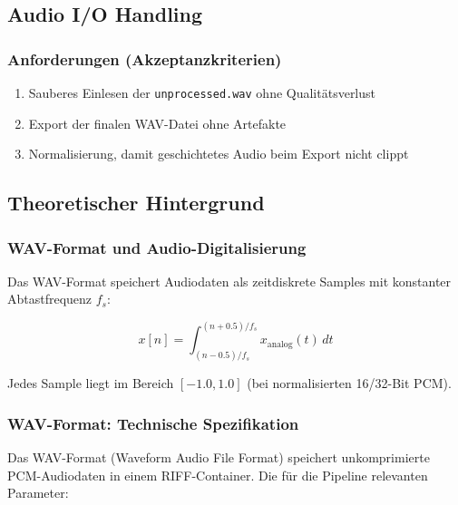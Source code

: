 \subsection{Audio I/O Handling}

\subsubsection{Anforderungen (Akzeptanzkriterien)}

\begin{enumerate}
    \item Sauberes Einlesen der \texttt{unprocessed.wav} ohne Qualit\"atsverlust
    \item Export der finalen WAV-Datei ohne Artefakte
    \item Normalisierung, damit geschichtetes Audio beim Export nicht clippt
\end{enumerate}

\subsection{Theoretischer Hintergrund}

\subsubsection{WAV-Format und Audio-Digitalisierung}

Das WAV-Format speichert Audiodaten als zeitdiskrete Samples mit konstanter Abtastfrequenz $f_s$:

$$x[n] = \int_{(n-0.5)/f_s}^{(n+0.5)/f_s} x_{\text{analog}}(t) \, dt$$

Jedes Sample liegt im Bereich $[-1.0, 1.0]$ (bei normalisierten 16/32-Bit PCM).

\subsubsection{WAV-Format: Technische Spezifikation}

Das WAV-Format (Waveform Audio File Format) speichert unkomprimierte PCM-Audiodaten
in einem RIFF-Container. Die f\"ur die Pipeline relevanten Parameter:

